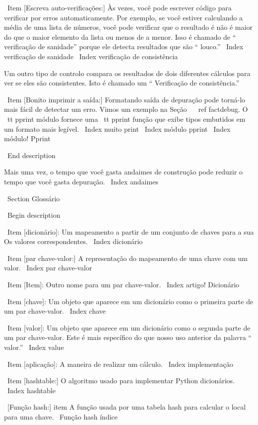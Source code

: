 \documentclass[10pt]{book}
\begin{document}
\begin {itemize}
{{{{{{{\ Item [Escreva auto-verificações:] Às vezes, você pode escrever código para verificar
por erros automaticamente. Por exemplo, se você estiver calculando a
média de uma lista de números, você pode verificar que o resultado é
não é maior do que o maior elemento da lista ou menos de
a menor. Isso é chamado de `` verificação de sanidade'' porque ele detecta
resultados que são `` louco.''
\ Index {verificação de sanidade}
\ Index {verificação de consistência}

Um outro tipo de controlo compara os resultados de dois diferentes
cálculos para ver se eles são consistentes. Isto é chamado um
`` Verificação de consistência.''

\ Item [Bonito imprimir a saída:] Formatando saída de depuração
pode torná-lo mais fácil de detectar um erro. Vimos um exemplo na
Seção ~ \ ref {} factdebug. O {\ tt pprint} módulo fornece
uma {\ tt pprint} função que exibe tipos embutidos em
um formato mais legível.
\ Index {muito print}
\ Index {módulo pprint}
\ Index {módulo! Pprint}

\ End {description}

Mais uma vez, o tempo que você gasta andaimes de construção pode reduzir
o tempo que você gasta depuração.
\ Index {} andaimes

\ Section {} Glossário

\ Begin {description}

\ Item [dicionário]: Um mapeamento a partir de um conjunto de chaves para a sua
Os valores correspondentes.
\ Index {} dicionário

\ Item [par chave-valor:] A representação do mapeamento de
uma chave com um valor.
\ Index {par chave-valor}

\ Item [Item]: Outro nome para um par chave-valor.
\ Index {artigo! Dicionário}

\ Item [chave]: Um objeto que aparece em um dicionário como o
primeira parte de um par chave-valor.
\ Index {chave}

\ Item [valor]: Um objeto que aparece em um dicionário como o
segunda parte de um par chave-valor. Este é mais específico do que
nosso uso anterior da palavra `` valor.''
\ Index {value}

\ Item [aplicação]: A maneira de realizar um cálculo.
\ Index {implementação}

\ Item [hashtable:] O algoritmo usado para implementar Python
dicionários.
\ Index {} hashtable

\ [Função hash:] item A função usada por uma tabela hash para calcular o
local para uma chave.
\ {Função hash} índice

}}}}}}}
\end{itemize}
\end{document}
